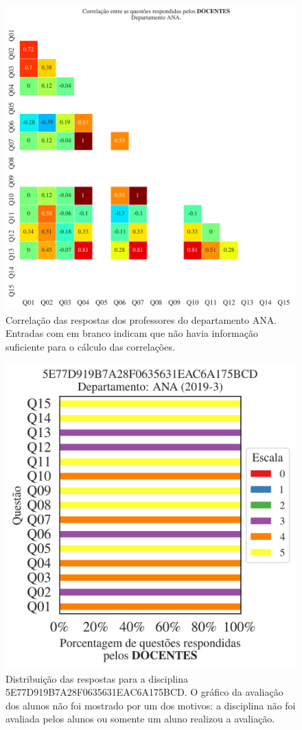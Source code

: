 \documentclass[a4paper,10pt]{article}
\begin{document}
\begin{figure}[h]
\centering
\includegraphics[width=0.999\linewidth]{matriz_corr__ANA_docentes.png}
\caption{\label{fig:corr_docentes}Correlação das respostas dos professores do departamento ANA. Entradas com em branco indicam que não havia informação suficiente para o cálculo das correlações.}
\end{figure}
\begin{figure}[h]
\centering
\includegraphics[width=0.485\linewidth]{analise_disciplina_departamento_ANA_5E77D919B7A28F0635631EAC6A175BCD_docentes.png}
\caption{\label{fig:analise_geral_departamento}                Distribuição das respostas para a disciplina 5E77D919B7A28F0635631EAC6A175BCD. O gráfico da avaliação dos alunos não foi mostrado  por um dos motivos:  a disciplina não foi avaliada pelos alunos ou somente um aluno realizou a avaliação. }
\end{figure}
\end{document}
